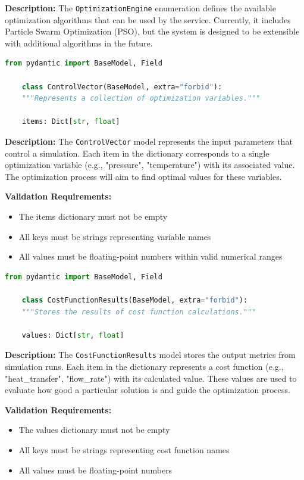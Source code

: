 \textbf{Description:}
The \texttt{OptimizationEngine} enumeration defines the available optimization algorithms that can be used by the service. Currently, it includes Particle Swarm Optimization (PSO), but the system is designed to be extensible with additional algorithms in the future.

\begin{lstlisting}[language=Python, caption={ControlVector model definition}]
	from pydantic import BaseModel, Field

	class ControlVector(BaseModel, extra="forbid"):
	"""Represents a collection of optimization variables."""

	items: Dict[str, float]
\end{lstlisting}

\textbf{Description:}
The \texttt{ControlVector} model represents the input parameters that control a simulation. Each item in the dictionary corresponds to a single optimization variable (e.g., "pressure", "temperature") with its associated value. The optimization process will aim to find optimal values for these variables.

\textbf{Validation Requirements:}
\begin{itemize}
	\item The items dictionary must not be empty
	\item All keys must be strings representing variable names
	\item All values must be floating-point numbers within valid numerical ranges
\end{itemize}

\begin{lstlisting}[language=Python, caption={CostFunctionResults model definition}]
	from pydantic import BaseModel, Field

	class CostFunctionResults(BaseModel, extra="forbid"):
	"""Stores the results of cost function calculations."""

	values: Dict[str, float]
\end{lstlisting}

\textbf{Description:}
The \texttt{CostFunctionResults} model stores the output metrics from simulation runs. Each item in the dictionary represents a cost function (e.g., "heat\_transfer", "flow\_rate") with its calculated value. These values are used to evaluate how good a particular solution is and guide the optimization process.

\textbf{Validation Requirements:}
\begin{itemize}
	\item The values dictionary must not be empty
	\item All keys must be strings representing cost function names
	\item All values must be floating-point numbers
\end{itemize}

